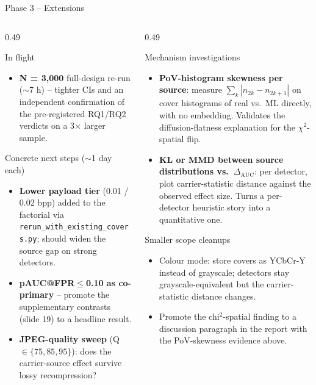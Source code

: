 \documentclass[aspectratio=169,11pt]{beamer}
\begin{document}
\begin{frame}{Phase 3 -- Extensions}
\scriptsize
\begin{columns}[T]
\begin{column}{0.49\textwidth}
\begin{block}{In flight}
\begin{itemize}\setlength{\itemsep}{1pt}
\item \textbf{N = 3{,}000} full-design re-run ($\sim$7 h) -- tighter CIs and an independent confirmation of the pre-registered RQ1/RQ2 verdicts on a 3$\times$ larger sample.
\end{itemize}
\end{block}
\begin{block}{Concrete next steps ($\sim$1 day each)}
\begin{itemize}\setlength{\itemsep}{1pt}
\item \textbf{Lower payload tier} (0.01 / 0.02 bpp) added to the factorial via \texttt{rerun\_with\_existing\_covers.py}; should widen the source gap on strong detectors.
\item \textbf{pAUC@FPR$\leq$0.10 as co-primary} -- promote the supplementary contrasts (slide 19) to a headline result.
\item \textbf{JPEG-quality sweep} (Q$\in\{75,85,95\}$): does the carrier-source effect survive lossy recompression?
\end{itemize}
\end{block}
\end{column}
\begin{column}{0.49\textwidth}
\begin{block}{Mechanism investigations}
\begin{itemize}\setlength{\itemsep}{1pt}
\item \textbf{PoV-histogram skewness per source}: measure $\sum_k|n_{2k}-n_{2k+1}|$ on cover histograms of real vs.\ ML directly, with no embedding. Validates the diffusion-flatness explanation for the $\chi^2$-spatial flip.
\item \textbf{KL or MMD between source distributions vs.\ $\Delta_\text{AUC}$}: per detector, plot carrier-statistic distance against the observed effect size. Turns a per-detector heuristic story into a quantitative one.
\end{itemize}
\end{block}
\begin{block}{Smaller scope cleanups}
\begin{itemize}\setlength{\itemsep}{1pt}
\item Colour mode: store covers as YCbCr-Y instead of grayscale; detectors stay grayscale-equivalent but the carrier-statistic distance changes.
\item Promote the chi$^2$-spatial finding to a discussion paragraph in the report with the PoV-skewness evidence above.
\end{itemize}
\end{block}
\end{column}
\end{columns}
\end{frame}
\end{document}
